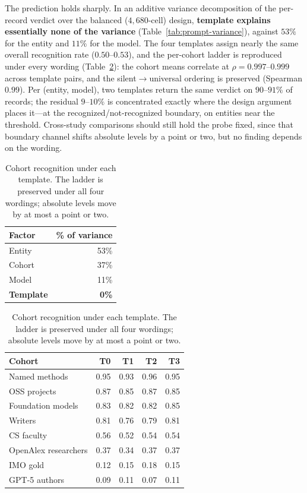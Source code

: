 The prediction holds sharply. In an additive variance decomposition of the per-record verdict over the balanced ($4{,}680$-cell) design, \textbf{template explains essentially none of the variance} (Table~\ref{tab:prompt-variance}), against $53\%$ for the entity and $11\%$ for the model. The four templates assign nearly the same overall recognition rate ($0.50$--$0.53$), and the per-cohort ladder is reproduced under every wording (Table~\ref{tab:prompt-cohort}): the cohort means correlate at $\rho = 0.997$--$0.999$ across template pairs, and the silent$\to$universal ordering is preserved (Spearman $0.99$). Per (entity, model), two templates return the same verdict on $90$--$91\%$ of records; the residual $9$--$10\%$ is concentrated exactly where the design argument places it---at the recognized/not-recognized boundary, on entities near the threshold. Cross-study comparisons should still hold the probe fixed, since that boundary channel shifts absolute levels by a point or two, but no finding depends on the wording.

\begin{table}[!htbp]
\centering
\small
\begin{minipage}[t]{0.42\textwidth}
\centering
\caption{Additive variance decomposition over the paraphrase records. Template is a negligible component beside entity, cohort, and model.}
\label{tab:prompt-variance}
\begin{tabular}{lr}
\toprule
Factor & \% of variance \\
\midrule
Entity & 53\% \\
Cohort & 37\% \\
Model & 11\% \\
\textbf{Template} & \textbf{0\%} \\
\bottomrule
\end{tabular}
\end{minipage}\hfill
\begin{minipage}[t]{0.54\textwidth}
\centering
\caption{Cohort recognition under each template. The ladder is preserved under all four wordings; absolute levels move by at most a point or two.}
\label{tab:prompt-cohort}
\begin{tabular}{lrrrr}
\toprule
Cohort & T0 & T1 & T2 & T3 \\
\midrule
Named methods & 0.95 & 0.93 & 0.96 & 0.95 \\
OSS projects & 0.87 & 0.85 & 0.87 & 0.85 \\
Foundation models & 0.83 & 0.82 & 0.82 & 0.85 \\
Writers & 0.81 & 0.76 & 0.79 & 0.81 \\
CS faculty & 0.56 & 0.52 & 0.54 & 0.54 \\
OpenAlex researchers & 0.37 & 0.34 & 0.37 & 0.37 \\
IMO gold & 0.12 & 0.15 & 0.18 & 0.15 \\
GPT-5 authors & 0.09 & 0.11 & 0.07 & 0.11 \\
\bottomrule
\end{tabular}
\end{minipage}
\end{table}

